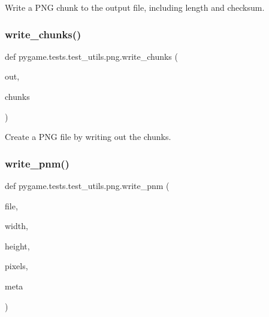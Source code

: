 \begin{DoxyVerb}Write a PNG chunk to the output file, including length and
checksum.
\end{DoxyVerb}
 \mbox{\label{namespacepygame_1_1tests_1_1test__utils_1_1png_ae122163baeb50475df9101b869e9cff2}} 
\subsubsection{\texorpdfstring{write\+\_\+chunks()}{write\_chunks()}}
{\footnotesize\ttfamily def pygame.\+tests.\+test\+\_\+utils.\+png.\+write\+\_\+chunks (\begin{DoxyParamCaption}\item[{}]{out,  }\item[{}]{chunks }\end{DoxyParamCaption})}

\begin{DoxyVerb}Create a PNG file by writing out the chunks.\end{DoxyVerb}
 \mbox{\label{namespacepygame_1_1tests_1_1test__utils_1_1png_afe203f587eb83f794595e0f9fb20e6d7}} 
\subsubsection{\texorpdfstring{write\+\_\+pnm()}{write\_pnm()}}
{\footnotesize\ttfamily def pygame.\+tests.\+test\+\_\+utils.\+png.\+write\+\_\+pnm (\begin{DoxyParamCaption}\item[{}]{file,  }\item[{}]{width,  }\item[{}]{height,  }\item[{}]{pixels,  }\item[{}]{meta }\end{DoxyParamCaption})}

